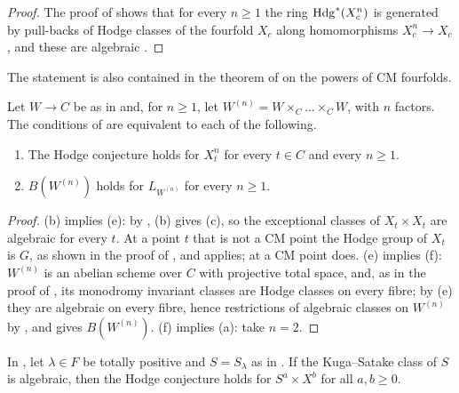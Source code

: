 \begin{proof}
The proof of  shows that for every $n\ge1$ the ring
$\mathrm{Hdg}^{*}(X_{c}^{n})$ is generated by pull-backs of Hodge classes of the
fourfold $X_{c}$ along homomorphisms $X_{c}^{n}\to X_{c}$, and these are
algebraic \cite{Mar25a}.
\end{proof}

The statement is also contained in the theorem of \cite{Li26} on the
powers of CM fourfolds.

\begin{corollary}
\label{cor:mumfordpowersequiv}
Let $W\to C$ be as in  and, for $n\ge1$, let
$W^{(n)}=W\times_{C}\dots\times_{C}W$, with $n$ factors. The conditions of
 are equivalent to each of the following.
\begin{enumerate}[label=\textup{(\alph*)},start=5,leftmargin=2.6em,itemsep=2pt]
\item The Hodge conjecture holds for $X_{t}^{n}$ for every $t\in C$ and
  every $n\ge1$.
\item $B(W^{(n)})$ holds for $L_{W^{(n)}}$ for every $n\ge1$.
\end{enumerate}
\end{corollary}

\begin{proof}
(b) implies (e): by , (b) gives (c), so the
exceptional classes of $X_{t}\times X_{t}$ are algebraic for every $t$. At a
point $t$ that is not a CM point the Hodge group of $X_{t}$ is $G$, as shown
in the proof of , and 
applies; at a CM point  does. (e) implies (f):
$W^{(n)}$ is an abelian scheme over $C$ with projective total space, and, as
in the proof of , its monodromy invariant classes are
Hodge classes on every fibre; by (e) they are algebraic on every fibre, hence
restrictions of algebraic classes on $W^{(n)}$ by , and
 gives $B(W^{(n)})$. (f) implies (a): take $n=2$.
\end{proof}

\begin{corollary}\label{cor:mumfordksproducts}
In , let $\lambda\in F$ be totally positive and
$S=S_{\lambda}$ as in . If the Kuga--Satake class of $S$
is algebraic, then the Hodge conjecture holds for $S^{a}\times X^{b}$ for all
$a,b\ge0$.
\end{corollary}

